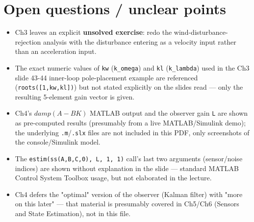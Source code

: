 \documentclass[11pt]{article}
\begin{document}
\section{Open questions / unclear points}

\begin{itemize}
\item Ch3 leaves an explicit \textbf{unsolved exercise}: redo the wind-disturbance-rejection analysis with the disturbance entering as a velocity input rather than an acceleration input.
\item The exact numeric values of \texttt{kw} (\texttt{k\_\allowbreak{}omega}) and \texttt{kl} (\texttt{k\_\allowbreak{}lambda}) used in the Ch3 slide 43-44 inner-loop pole-placement example are referenced (\texttt{roots([1,kw,kl])}) but not stated explicitly on the slides read — only the resulting 5-element gain vector is given.
\item Ch4's $damp(A-B K)$ MATLAB output and the observer gain \texttt{L} are shown as pre-computed results (presumably from a live MATLAB/Simulink demo); the underlying \texttt{.m}/\texttt{.slx} files are not included in this PDF, only screenshots of the console/Simulink model.
\item The \texttt{estim(ss(A,B,C,0), L, 1, 1)} call's last two arguments (sensor/noise indices) are shown without explanation in the slide — standard MATLAB Control System Toolbox usage, but not elaborated in the lecture.
\item Ch4 defers the "optimal" version of the observer (Kalman filter) with "more on this later" — that material is presumably covered in Ch5/Ch6 (Sensors and State Estimation), not in this file.
\end{itemize}
\end{document}
